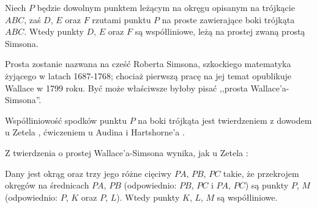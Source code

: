 
\begin{definition}
%
	Niech $P$ będzie dowolnym punktem leżącym na okręgu opisanym na trójkącie $ABC$, zaś $D$, $E$ oraz $F$ rzutami punktu $P$ na proste zawierające boki trójkąta $ABC$.
	Wtedy punkty $D$, $E$ oraz $F$ są współliniowe, leżą na prostej zwaną prostą Simsona.
\end{definition}

Prosta zostanie nazwana na cześć Roberta Simsona, szkockiego matematyka żyjącego w latach 1687-1768; chociaż pierwszą pracę na jej temat opublikuje Wallace w 1799 roku.
Być może właściwsze byłoby pisać ,,prosta Wallace'a-Simsona''.

Współliniowość spodków punktu $P$ na boki trójkąta jest twierdzeniem z dowodem u Zetela \cite[s. 55]{zetel_2020}, ćwiczeniem u Audina \cite[s. 104]{audin_2003} i Hartshorne'a \cite[s. 61]{hartshorne2000}.


Z twierdzenia o prostej Wallace'a-Simsona wynika, jak u Zetela \cite[s. 57]{zetel_2020}:

\begin{proposition}
	Dany jest okrąg oraz trzy jego różne cięciwy $PA$, $PB$, $PC$ takie, że przekrojem okręgów na średnicach $PA$, $PB$ (odpowiednio: $PB$, $PC$ i $PA$, $PC$) są punkty $P$, $M$ (odpowiednio: $P$, $K$ oraz $P$, $L$).
	Wtedy punkty $K$, $L$, $M$ są współliniowe.
\end{proposition}

